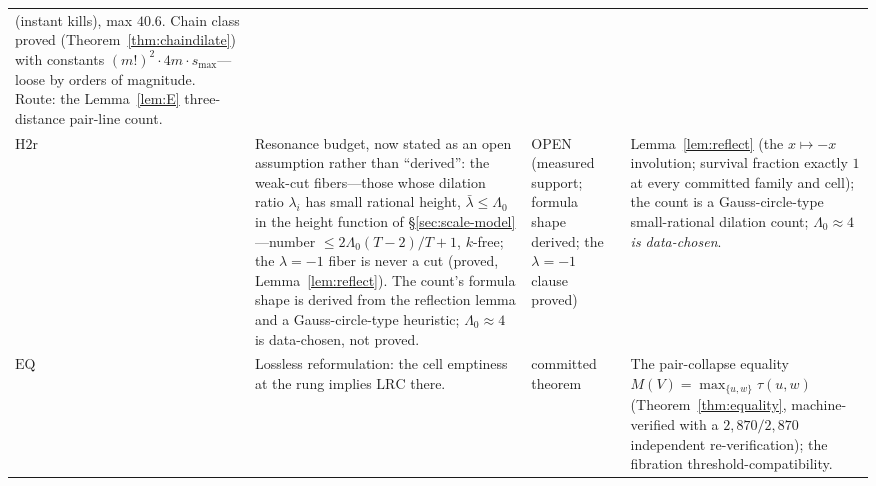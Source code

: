 {\begin{longtable}{@{}p{}p{}
                   p{}p{}@{}}
(instant kills), max $40.6$. Chain class proved
(Theorem~\ref{thm:chaindilate}) with constants $(m!)^2\cdot 4m\cdot
s_{\max}$---loose by orders of magnitude. Route: the
Lemma~\ref{lem:E} three-distance pair-line count. \\
$\mathrm{H2r}$ &
Resonance budget, now stated as an open assumption rather than
``derived'': the weak-cut fibers---those whose dilation ratio
$\lambda_i$ has small rational height, $\bar\lambda\le\Lambda_0$ in
the height function of \S\ref{sec:scale-model}---number $\le
2\Lambda_0(T-2)/T+1$, $k$-free; the $\lambda=-1$ fiber is never a cut
(proved, Lemma~\ref{lem:reflect}). The count's formula shape is
derived from the reflection lemma and a Gauss-circle-type heuristic;
$\Lambda_0\approx 4$ is data-chosen, not proved. &
OPEN (measured support; formula shape derived; the $\lambda=-1$ clause
proved) &
Lemma~\ref{lem:reflect} (the $x\mapsto-x$ involution; survival
fraction exactly $1$ at every committed family and cell); the count is
a Gauss-circle-type small-rational dilation count;
\emph{$\Lambda_0\approx 4$ is data-chosen}. \\
$\mathrm{EQ}$ &
Lossless reformulation: the cell emptiness at the rung implies
$\mathrm{LRC}$ there. &
committed theorem &
The pair-collapse equality
$M(V)=\max_{\{u,w\}}\tau(u,w)$ (Theorem~\ref{thm:equality},
machine-verified with a $2{,}870/2{,}870$ independent re-verification);
the fibration threshold-compatibility. \\
\end{longtable}
}

